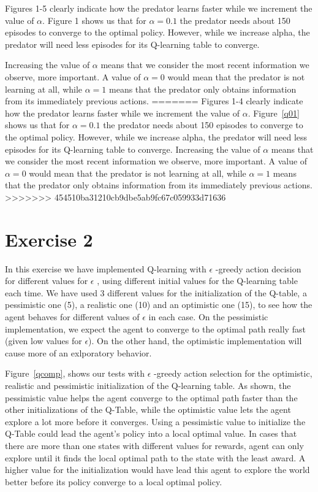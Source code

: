 \documentclass[a4paper,11pt]{article}
\begin{document}
Figures 1-5 clearly indicate how the predator learns faster while we increment the value of $\alpha$. Figure 1 shows us that for $\alpha = 0.1$ the predator needs about 150 episodes to converge to the optimal policy. However, while we increase alpha, the predator will need less episodes for its Q-learning table to converge. 

Increasing the value of $\alpha$ means that we consider the most recent information we observe, more important. A value of $\alpha = 0$ would mean that the predator is not learning at all, while $\alpha = 1$ means that the predator only obtains information from its immediately previous actions. 
=======
Figures 1-4 clearly indicate how the predator learns faster while we increment the value of $\alpha$. Figure~\ref{q01} shows us that for $\alpha = 0.1$ the predator needs about 150 episodes to converge to the optimal policy. However, while we increase alpha, the predator will need less episodes for its Q-learning table to converge. Increasing the value of $\alpha$ means that we consider the most recent information we observe, more important. A value of $\alpha = 0$ would mean that the predator is not learning at all, while $\alpha = 1$ means that the predator only obtains information from its immediately previous actions. 
>>>>>>> 454510ba31210cb9dbe5ab9fc67c059933d71636
 
\section*{Exercise 2}

In this exercise we have implemented Q-learning with $\epsilon$ -greedy action decision for different values for $\epsilon$ , using different initial values for the Q-learning table each time. We have used 3 different values for the initialization of the Q-table, a pessimistic one (5), a realistic one (10) and an optimistic one (15), to see how the agent behaves for different values of $\epsilon$ in each case. On the pessimistic implementation, we expect the agent to converge to the optimal path really fast (given low values for $\epsilon$). On the other hand, the optimistic implementation will cause more of an exlporatory behavior.


Figure~\ref{qcomp}, shows our tests with $\epsilon$ -greedy action selection for the optimistic, realistic and pessimistic initialization of the Q-learning table. As shown, the pessimistic value helps the agent converge to the optimal path faster than the other initializations of the Q-Table, while the optimistic value lets the agent explore a lot more before it converges. Using a pessimistic value to initialize the Q-Table could lead the agent's policy into a local optimal value. In cases that there are more than one states with different values for rewards, agent can only explore until it finds the local optimal path to the state with the least award. A higher value for the initialization would have lead this agent to explore the world better before its policy converge to a local optimal policy. 
\end{document}
